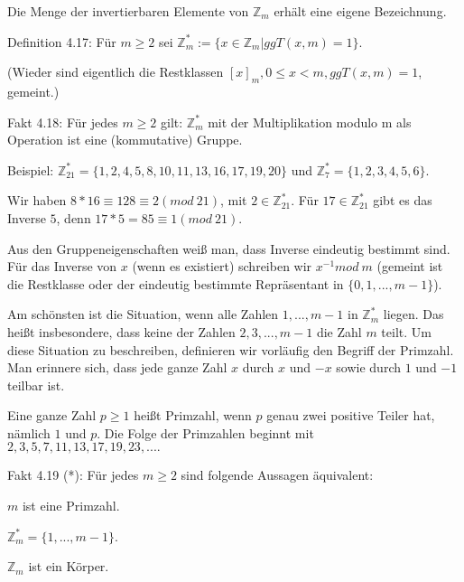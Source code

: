\documentclass[a4paper]{article}
\begin{document}
\begin{multicols}{3}
    Die Menge der invertierbaren Elemente von $\mathbb{Z}_m$ erhält eine eigene Bezeichnung.

    Definition 4.17: Für $m\geq 2$ sei $\mathbb{Z}^*_m:=\{x\in\mathbb{Z}_m| ggT(x,m)=1\}$.

    (Wieder sind eigentlich die Restklassen $[x]_m, 0\leq x < m, ggT(x,m) = 1$, gemeint.)

    Fakt 4.18: Für jedes $m\geq 2$ gilt: $\mathbb{Z}^*_m$ mit der Multiplikation modulo m als Operation ist eine (kommutative) Gruppe.

    Beispiel: $\mathbb{Z}^*_{21}=\{1,2,4,5,8,10,11,13,16,17,19,20\}$ und $\mathbb{Z}^*_7=\{1,2,3,4,5,6\}$.

    Wir haben $8*16 \equiv 128 \equiv 2 (mod\ 21)$, mit $2\in\mathbb{Z}^*_{21}$. Für $17\in\mathbb{Z}^*_{21}$ gibt es das Inverse $5$, denn $17*5 = 85\equiv 1 (mod\ 21)$.

    Aus den Gruppeneigenschaften weiß man, dass Inverse eindeutig bestimmt sind. Für das Inverse von $x$ (wenn es existiert) schreiben wir $x^{-1} mod\ m$ (gemeint ist die Restklasse oder der eindeutig bestimmte Repräsentant in $\{0,1 ,...,m-1\}$).

    Am schönsten ist die Situation, wenn alle Zahlen $1,...,m-1$ in $\mathbb{Z}^*_m$ liegen. Das heißt insbesondere, dass keine der Zahlen $2, 3 ,...,m-1$ die Zahl $m$ teilt. Um diese Situation zu beschreiben, definieren wir vorläufig den Begriff der Primzahl. Man erinnere sich, dass jede ganze Zahl $x$ durch $x$ und $-x$ sowie durch $1$ und $-1$ teilbar ist.

    Eine ganze Zahl $p\geq 1$ heißt Primzahl, wenn $p$ genau zwei positive Teiler hat, nämlich $1$ und $p$. Die Folge der Primzahlen beginnt mit $2, 3 , 5 , 7 , 11 , 13 , 17 , 19 , 23 ,....$

    Fakt 4.19 (*): Für jedes $m\geq 2$ sind folgende Aussagen äquivalent:
    \begin{enumerate*}
        \item $m$ ist eine Primzahl.
        \item  $\mathbb{Z}^*_m=\{ 1 ,...,m-1\}$.
        \item  $\mathbb{Z}_m$ ist ein Körper.
    \end{enumerate*}


\end{multicols}
\end{document}
